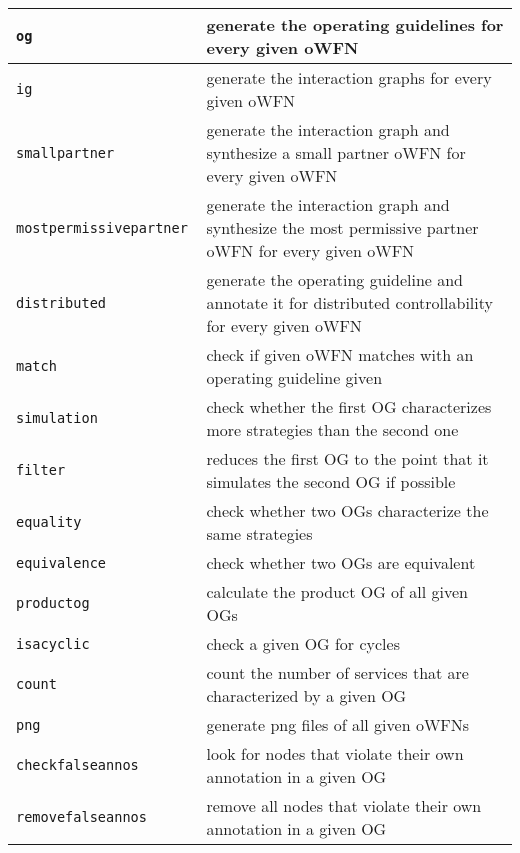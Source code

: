 
\begin{longtable}{lp{200pt}}
\hline
\texttt{og  }& generate the operating guidelines for every given oWFN \\
\hline
\texttt{ig  }& generate the interaction graphs for every given oWFN \\
\hline
\texttt{smallpartner }& generate the interaction graph and synthesize a small partner oWFN for every given oWFN \\
\hline
\texttt{mostpermissivepartner   }& generate the interaction graph and synthesize the most permissive partner oWFN for every given oWFN \\
\hline
\texttt{distributed }& generate the operating guideline and annotate it for distributed controllability for every given oWFN \\
\hline
\texttt{match   }& check if given oWFN matches with an operating guideline given \\
\hline
\texttt{simulation }& check whether the first OG characterizes more strategies than the second one \\
\hline
\texttt{filter }& reduces the first OG to the point that it simulates the second OG if possible \\
\hline
\texttt{equality }& check whether two OGs characterize the same strategies \\
\hline
\texttt{equivalence }& check whether two OGs are equivalent \\
\hline
\texttt{productog }& calculate the product OG of all given OGs \\
\hline
\texttt{isacyclic }& check a given OG for cycles \\
\hline
\texttt{count }& count the number of services that are characterized by a given OG \\
\hline
\texttt{png }& generate png files of all given oWFNs \\
\hline
\texttt{checkfalseannos }& look for nodes that violate their own annotation in
a given OG\\
\hline
\texttt{removefalseannos }& remove all nodes that violate their own annotation
in a given OG\\
\hline

\end{longtable}
